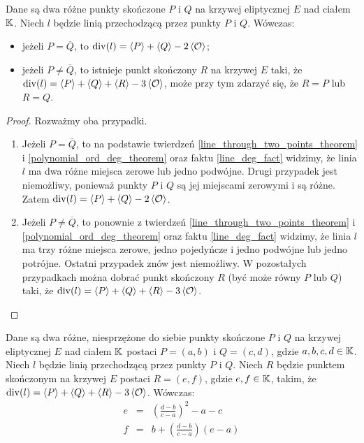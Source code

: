 \begin{theorem}
Dane są dwa różne punkty skończone $P$ i $Q$
na krzywej eliptycznej $E$ nad ciałem $\mathbb{K}$.
Niech $l$ będzie linią przechodzącą przez punkty $P$ i $Q$.
Wówczas:
\begin{itemize}
\item jeżeli $P = \overline{Q}$,
to $\operatorname{div}(l) = \left\langle P\right\rangle + \left\langle Q\right\rangle - 2\left\langle\mathcal{O}\right\rangle$;
\item jeżeli $P \neq \overline{Q}$,
to istnieje punkt skończony $R$ na krzywej $E$ taki,
że $\operatorname{div}(l) = \left\langle P\right\rangle + \left\langle Q\right\rangle + \left\langle R\right\rangle - 3\left\langle\mathcal{O}\right\rangle$,
może przy tym zdarzyć się, że $R = P$ lub $R = Q$.
\end{itemize}
\end{theorem}

\begin{proof}
Rozważmy oba przypadki.
\begin{enumerate}
\item
Jeżeli $P = \overline{Q}$,
to na podstawie twierdzeń
\ref{line_through_two_points_theorem} i \ref{polynomial_ord_deg_theorem}
oraz faktu \ref{line_deg_fact} widzimy,
że linia $l$ ma dwa różne miejsca zerowe lub jedno podwójne.
Drugi przypadek jest niemożliwy,
ponieważ punkty $P$ i $Q$ są jej miejscami zerowymi i są różne.
Zatem $\operatorname{div}(l) = \left\langle P\right\rangle + \left\langle Q\right\rangle - 2\left\langle\mathcal{O}\right\rangle$.
\item
Jeżeli $P \neq \overline{Q}$,
to ponownie z twierdzeń
\ref{line_through_two_points_theorem} i \ref{polynomial_ord_deg_theorem}
oraz faktu \ref{line_deg_fact} widzimy,
że linia $l$ ma trzy różne miejsca zerowe, jedno pojedyńcze i jedno podwójne
lub jedno potrójne.
Ostatni przypadek znów jest niemożliwy.
W pozostałych przypadkach można dobrać punkt skończony $R$
(być może równy $P$ lub $Q$) taki,
że $\operatorname{div}(l) = \left\langle P\right\rangle + \left\langle Q\right\rangle + \left\langle R\right\rangle - 3\left\langle\mathcal{O}\right\rangle$.
\end{enumerate}
\end{proof}

\begin{theorem}
Dane są dwa różne, niesprzężone do siebie
punkty skończone $P$ i $Q$ na krzywej eliptycznej $E$ nad ciałem $\mathbb{K}$
postaci $P = (a, b)$ i $Q = (c, d)$, gdzie $a, b, c, d \in \mathbb{K}$.
Niech $l$ będzie linią przechodzącą przez punkty $P$ i $Q$.
Niech $R$ będzie punktem skończonym na krzywej $E$
postaci $R = (e, f)$, gdzie $e, f \in \mathbb{K}$, takim,
że $\operatorname{div}(l) = \left\langle P\right\rangle + \left\langle Q\right\rangle + \left\langle R\right\rangle - 3\left\langle\mathcal{O}\right\rangle$.
Wówczas:
\begin{eqnarray}
\label{chord_line_third_point_x_eqn}
e & = & \left(\frac{d-b}{c-a}\right)^2 - a - c \\
\label{chord_line_third_point_y_eqn}
f & = & b + \left(\frac{d-b}{c-a}\right)(e-a)
\end{eqnarray}
\end{theorem}

